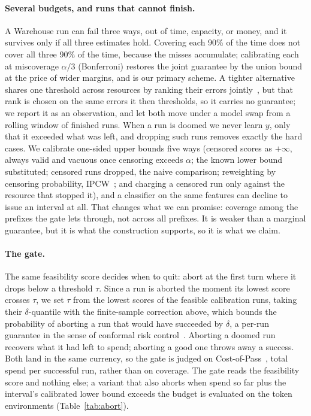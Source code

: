 \paragraph{Several budgets, and runs that cannot finish.}
A Warehouse run can fail three ways, out of time, capacity, or money, and it survives only if all three estimates hold. Covering each 90\% of the time does not cover all three 90\% of the time, because the misses accumulate; calibrating each at miscoverage $\alpha/3$ (Bonferroni) restores the joint guarantee by the union bound at the price of wider margins, and is our primary scheme. A tighter alternative shares one threshold across resources by ranking their errors jointly~\cite{messoudi2021copula}, but that rank is chosen on the same errors it then thresholds, so it carries no guarantee; we report it as an observation, and let both move under a model swap from a rolling window of finished runs. When a run is doomed we never learn $y$, only that it exceeded what was left, and dropping such runs removes exactly the hard cases. We calibrate one-sided upper bounds five ways (censored scores as $+\infty$, always valid and vacuous once censoring exceeds $\alpha$; the known lower bound substituted; censored runs dropped, the naive comparison; reweighting by censoring probability, IPCW~\cite{robins1992recovery,gui2024conformalized}; and charging a censored run only against the resource that stopped it), and a classifier on the same features can decline to issue an interval at all. That changes what we can promise: coverage among the prefixes the gate lets through, not across all prefixes. It is weaker than a marginal guarantee, but it is what the construction supports, so it is what we claim.

\paragraph{The gate.}
The same feasibility score decides when to quit: abort at the first turn where it drops below a threshold $\tau$. Since a run is aborted the moment its lowest score crosses $\tau$, we set $\tau$ from the lowest scores of the feasible calibration runs, taking their $\delta$-quantile with the finite-sample correction above, which bounds the probability of aborting a run that would have succeeded by $\delta$, a per-run guarantee in the sense of conformal risk control~\cite{angelopoulos2024crc}. Aborting a doomed run recovers what it had left to spend; aborting a good one throws away a success. Both land in the same currency, so the gate is judged on Cost-of-Pass~\cite{erol2026costofpass}, total spend per successful run, rather than on coverage. The gate reads the feasibility score and nothing else; a variant that also aborts when spend so far plus the interval's calibrated lower bound exceeds the budget is evaluated on the token environments (Table~\ref{tab:abort}).

